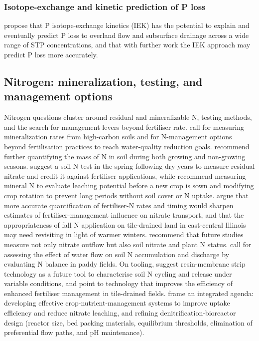\subsubsection{Isotope-exchange and kinetic prediction of P loss}

\textcite{McDowell2001} propose that P isotope-exchange kinetics (IEK) has the potential to explain and eventually predict P loss to overland flow and subsurface drainage across a wide range of STP concentrations, and that with further work the IEK approach may predict P loss more accurately.

\subsection{Nitrogen: mineralization, testing, and management options}

Nitrogen questions cluster around residual and mineralizable N, testing methods, and the search for management levers beyond fertiliser rate. \textcite{Waring2022} call for measuring mineralization rates from high-carbon soils and for N-management options beyond fertilisation practices to reach water-quality reduction goals. \textcite{Bosompemaa2021} recommend further quantifying the mass of N in soil during both growing and non-growing seasons. \textcite{RANDALL1995} suggest a soil N test in the spring following dry years to measure residual nitrate and credit it against fertiliser applications, while \textcite{Conrad2009} recommend measuring mineral N to evaluate leaching potential before a new crop is sown and modifying crop rotation to prevent long periods without soil cover or N uptake. \textcite{Gentry2014} argue that more accurate quantification of fertiliser-N rates and timing would sharpen estimates of fertiliser-management influence on nitrate transport, and that the appropriateness of fall N application on tile-drained land in east-central Illinois may need revisiting in light of warmer winters. \textcite{ElGhannam2023} recommend that future studies measure not only nitrate outflow but also soil nitrate and plant N status. \textcite{Saiki2020} call for assessing the effect of water flow on soil N accumulation and discharge by evaluating N balance in paddy fields. On tooling, \textcite{Masri2024} suggest resin-membrane strip technology as a future tool to characterise soil N cycling and release under variable conditions, and \textcite{Kaur2024b} point to technology that improves the efficiency of enhanced fertiliser management in tile-drained fields. \textcite{Aide2016} frame an integrated agenda: developing effective crop-nutrient-management systems to improve uptake efficiency and reduce nitrate leaching, and refining denitrification-bioreactor design (reactor size, bed packing materials, equilibrium thresholds, elimination of preferential flow paths, and pH maintenance).

